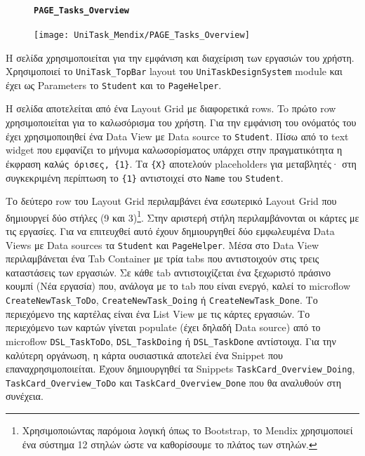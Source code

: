                 \begin{figure}[H] \noindent
                    \paragraph{\texttt{PAGE\_Tasks\_Overview}}
                    \begin{center}
                        \texttt{[image: UniTask\_Mendix/PAGE\_Tasks\_Overview]}
                    \end{center}
                \end{figure}

                Η σελίδα χρησιμοποιείται για την εμφάνιση και διαχείριση των εργασιών του χρήστη. Χρησιμοποιεί το \texttt{UniTask\_TopBar} layout του \texttt{UniTaskDesignSystem} module και έχει ως Parameters το \texttt{Student} και το \texttt{PageHelper}.

                Η σελίδα αποτελείται από ένα Layout Grid με διαφορετικά rows. To πρώτο row χρησιμοποιείται για το καλωσόρισμα του χρήστη. Για την εμφάνιση του ονόματός του έχει χρησιμοποιηθεί ένα Data View με Data source το \texttt{Student}. Πίσω από το text widget που εμφανίζει το μήνυμα καλωσορίσματος υπάρχει στην πραγματικότητα η έκφραση \verb|καλώς όρισες, {1}|. Τα \verb|{X}| αποτελούν placeholders για μεταβλητές· στη συγκεκριμένη περίπτωση το \verb|{1}| αντιστοιχεί στο \texttt{Name} του \texttt{Student}.

                Το δεύτερο row του Layout Grid περιλαμβάνει ένα εσωτερικό Layout Grid που δημιουργεί δύο στήλες (9 και 3)\footnote{Χρησιμοποιώντας παρόμοια λογική όπως το Bootstrap, το Mendix χρησιμοποιεί ένα σύστημα 12 στηλών ώστε να καθορίσουμε το πλάτος των στηλών.}. Στην αριστερή στήλη περιλαμβάνονται οι κάρτες με τις εργασίες. Για να επιτευχθεί αυτό έχουν δημιουργηθεί δύο εμφωλευμένα Data Views με Data sources τα \texttt{Student} και \texttt{PageHelper}. Μέσα στο Data View περιλαμβάνεται ένα Tab Container με τρία tabs που αντιστοιχούν στις τρεις καταστάσεις των εργασιών. Σε κάθε tab αντιστοιχίζεται ένα ξεχωριστό πράσινο κουμπί ({\Zona Νέα εργασία}) που, ανάλογα με το tab που είναι ενεργό, καλεί το microflow \texttt{CreateNewTask\_ToDo}, \texttt{CreateNewTask\_Doing} ή \texttt{CreateNewTask\_Done}. Το περιεχόμενο της καρτέλας είναι ένα List View με τις κάρτες εργασιών. Το περιεχόμενο των καρτών γίνεται populate (έχει δηλαδή Data source) από το microflow \texttt{DSL\_TaskToDo}, \texttt{DSL\_TaskDoing} ή \texttt{DSL\_TaskDone} αντίστοιχα. Για την καλύτερη οργάνωση, η κάρτα ουσιαστικά αποτελεί ένα Snippet που επαναχρησιμοποιείται. Έχουν δημιουργηθεί τα Snippets \texttt{TaskCard\_Overview\_Doing}, \texttt{TaskCard\_Overview\_ToDo} και \texttt{TaskCard\_Overview\_Done} που θα αναλυθούν στη συνέχεια.

